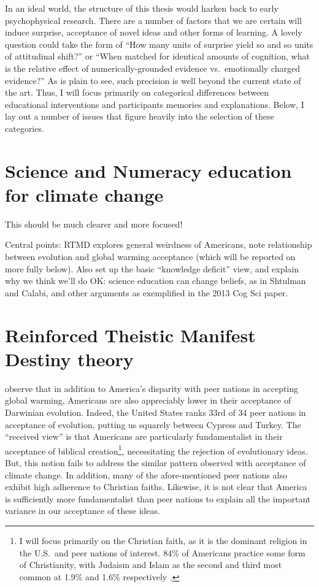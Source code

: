 In an ideal world, the structure of this thesis would harken back to early
psychophysical research. There are a number of factors that we are certain will
induce surprise, acceptance of novel ideas and other forms of learning. A
lovely question could take the form of ``How many units of surprise yield so and
so units of attitudinal shift?'' or ``When matched for identical amounts of
cognition, what is the relative effect of numerically-grounded evidence vs.\
emotionally charged evidence?'' As is plain to see, such precision is well
beyond the current state of the art. Thus, I will focus primarily on categorical
differences between educational interventions and participants memories and
explanations. Below, I lay out a number of issues that figure heavily into the
selection of these categories.

\section{Science and Numeracy education for climate change}

This should be much clearer and more focused! 

Central points: RTMD explores general weirdness of Americans, note relationship
between evolution and global warming acceptance (which will be reported on more
fully below). Also set up the basic “knowledge deficit” view, and explain why we
think we'll do OK: science education can change beliefs, as in Shtulman and
Calabi, and other arguments as exemplified in the 2013 Cog Sci paper.

\section{Reinforced Theistic Manifest Destiny theory}


\citeauthor{ranney_why_inpress} observe that in addition to America's disparity
with peer nations in accepting global warming, Americans are also appreciably
lower in their acceptance of Darwinian evolution. Indeed, the United States
ranks 33rd of 34 peer nations in acceptance of evolution, putting us
squarely between Cypress and Turkey. The ``received view'' is that Americans are
particularly fundamentalist in their acceptance of biblical creation\footnote{I
will focus primarily on the Christian faith, as it is the dominant religion in
the U.S.\ and peer nations of interest. 84\% of Americans practice some form of
Christianity, with Judaism and Islam as the second and third most common at
1.9\% and 1.6\% respectively \cite{wolfram_alpha_faith}.}, 
necessitating the rejection of evolutionary ideas. But, this notion fails to
address the similar pattern observed with acceptance of climate change. In
addition, many of the afore-mentioned peer nations also exhibit high adherence
to Christian faiths.  Likewise, it is not clear that America is sufficiently
more fundamentalist than peer nations to explain all the important variance in
our acceptance of these ideas. 

